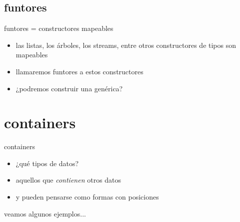 \documentclass[9pt]{beamer}
\begin{document}
\subsection{funtores}

\begin{frame}{funtores = constructores mapeables}
  \begin{itemize}
  \item las listas, los árboles, los streams, entre otros constructores de tipos son \alert{mapeables}
  \item llamaremos \alert{funtores} a estos constructores
  \item ¿podremos construir una  genérica?
  \end{itemize}
\end{frame}


\section{containers}

\begin{frame}{containers}
  \begin{itemize}
  \item[]¿qué tipos de datos?
  \item[]aquellos que \emph{contienen} otros datos
  \item[] y pueden pensarse como \alert{formas con posiciones}
  \end{itemize}
  \vspace{2cm}
  \begin{flushright}veamos algunos ejemplos...\end{flushright}
\end{frame}
\end{document}
